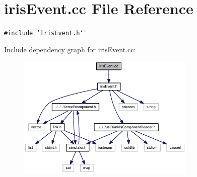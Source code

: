 \section{irisEvent.cc File Reference}
\label{irisEvent_8cc}
{\tt \#include \char`\"{}irisEvent.h\char`\"{}}\par


Include dependency graph for irisEvent.cc:\nopagebreak
\begin{figure}[H]
\begin{center}
\leavevmode
\includegraphics[width=240pt]{irisEvent_8cc__incl}
\end{center}
\end{figure}
